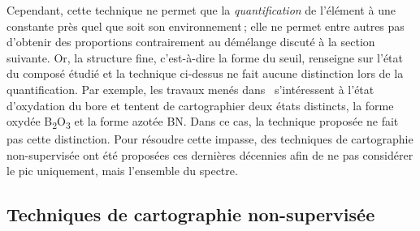     Cependant, cette technique ne permet que la \emph{quantification} de l'élément à une constante près quel que soit son environnement\,; elle ne permet entre autres pas d'obtenir des proportions contrairement au démélange discuté à la section suivante. Or, la structure fine, c'est-à-dire la forme du seuil, renseigne sur l'état du composé étudié et la technique ci-dessus ne fait aucune distinction lors de la quantification. Par exemple, les travaux menés dans~\cite{dobigeon2012spectral} s'intéressent à l'état d'oxydation du bore et tentent de cartographier deux états distincts, la forme oxydée B\textsubscript{2}O\textsubscript{3} et la forme azotée BN. Dans ce cas, la technique proposée ne fait pas cette distinction.
    Pour résoudre cette impasse, des techniques de cartographie non-supervisée ont été proposées ces dernières décennies afin de ne pas considérer le pic uniquement, mais l'ensemble du spectre.

    

    \subsection{Techniques de cartographie non-supervisée}\label{sec-demelange}
    
